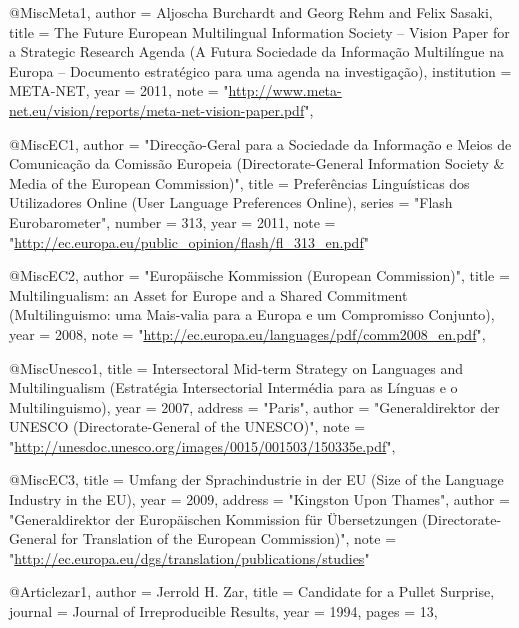 

@Misc{Meta1,
  author =	 {Aljoscha Burchardt and Georg Rehm and Felix Sasaki},
  title =	 {{The Future European Multilingual Information Society -- Vision
                  Paper for a Strategic Research Agenda (A Futura Sociedade da Informação Multilíngue na Europa -- Documento estratégico para uma agenda na investigação)}},
  institution =	 {META-NET},
  year =	 2011,
  note =         "\url{http://www.meta-net.eu/vision/reports/meta-net-vision-paper.pdf}",
}

@Misc{EC1,
  author =	 "Direcção-Geral para a Sociedade da Informação e Meios de Comunicação 
                              da Comissão Europeia (Directorate-General Information Society \& Media of the European
                  Commission)",
  title =	 {{Preferências Linguísticas dos Utilizadores Online (User Language Preferences Online)}},
  series =	 "Flash Eurobarometer",
  number =	 313,
  year =	 2011,
  note =
                  "\url{http://ec.europa.eu/public_opinion/flash/fl_313_en.pdf}"
}

@Misc{EC2,
  author =	 "Europäische Kommission (European Commission)",
  title =	 {{Multilingualism: an Asset
                  for Europe and a Shared Commitment (Multilinguismo: uma Mais-valia para a Europa e um Compromisso Conjunto)}},
  year =	 2008,
  note =
                  "\url{http://ec.europa.eu/languages/pdf/comm2008_en.pdf}",
}

@Misc{Unesco1,
  title =	 {{Intersectoral Mid-term Strategy on Languages and
                  Multilingualism (Estratégia Intersectorial Intermédia para as Línguas e o Multilinguismo)}},
  year =	 2007,
  address =	 "Paris",
  author =	 "Generaldirektor der UNESCO (Directorate-General of
                  the UNESCO)",
  note =
                  "\url{http://unesdoc.unesco.org/images/0015/001503/150335e.pdf}",
}

@Misc{EC3,
  title =	 {{Umfang der Sprachindustrie in der EU (Size of the
                  Language Industry in the EU)}},
  year =	 2009,
  address =	 "Kingston Upon Thames",
  author =	 "Generaldirektor der Europäischen Kommission für
                  Übersetzungen (Directorate-General for Translation
                  of the European Commission)",
  note =
                  "\url{http://ec.europa.eu/dgs/translation/publications/studies}"
}

@Article{zar1,
  author =	 {Jerrold H. Zar},
  title =	 {{Candidate for a Pullet Surprise}},
  journal =	 {Journal of Irreproducible Results},
  year =	 1994,
  pages =	 13,
}

